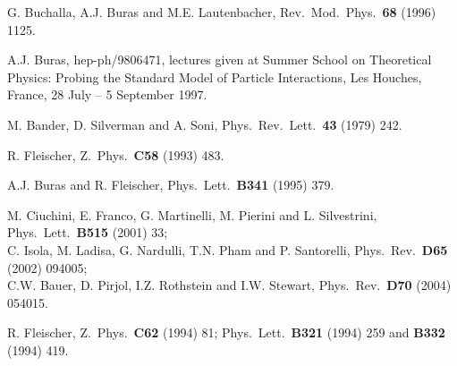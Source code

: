 \documentclass[11pt]{cernrep}
\begin{document}
\begin{thebibliography}{999}
G. Buchalla, A.J. Buras and M.E. Lautenbacher,
{ Rev.\ Mod.\ Phys.}~{\bf 68} (1996) 1125.
  
A.J. Buras, hep-ph/9806471, lectures given at 
Summer School on Theoretical Physics: Probing the Standard Model of 
Particle Interactions, Les Houches, France, 28 July -- 5 September 1997.

M. Bander, D. Silverman and A. Soni,
{ Phys.\ Rev.\ Lett.}~{\bf 43} (1979) 242.

R. Fleischer,
{ Z.\ Phys.}~{\bf C58} (1993) 483.

A.J. Buras and R. Fleischer,
{ Phys.\ Lett.}~{\bf B341} (1995) 379.

M. Ciuchini, E. Franco, G. Martinelli, M. Pierini 
and L. Silvestrini,
{ Phys.\ Lett.}~{\bf B515} (2001) 33;\\
C. Isola, M. Ladisa, G. Nardulli, T.N. Pham and P. Santorelli,
{ Phys.\ Rev.}~{\bf D65} (2002) 094005;\\
C.W. Bauer, D. Pirjol, I.Z. Rothstein and I.W. Stewart,
Phys.\ Rev.\  {\bf D70} (2004) 054015.

R. Fleischer,
{ Z.\ Phys.}~{\bf C62} (1994) 81;
{ Phys.\ Lett.}~{\bf B321} (1994) 259 and
{\bf B332} (1994) 419.


\end{thebibliography}
\end{document}
